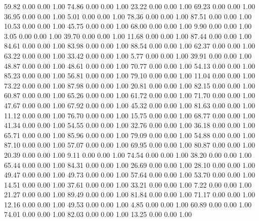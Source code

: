    59.82   0.00   0.00   1.00
   74.86   0.00   0.00   1.00
   23.22   0.00   0.00   1.00
   69.23   0.00   0.00   1.00
   36.95   0.00   0.00   1.00
    5.01   0.00   0.00   1.00
   78.36   0.00   0.00   1.00
   87.51   0.00   0.00   1.00
   10.53   0.00   0.00   1.00
   45.75   0.00   0.00   1.00
   68.00   0.00   0.00   1.00
    9.90   0.00   0.00   1.00
    3.05   0.00   0.00   1.00
   39.70   0.00   0.00   1.00
   11.68   0.00   0.00   1.00
   87.44   0.00   0.00   1.00
   84.61   0.00   0.00   1.00
   83.98   0.00   0.00   1.00
   88.54   0.00   0.00   1.00
   62.37   0.00   0.00   1.00
   63.22   0.00   0.00   1.00
   33.42   0.00   0.00   1.00
    5.77   0.00   0.00   1.00
   39.91   0.00   0.00   1.00
   48.87   0.00   0.00   1.00
   48.61   0.00   0.00   1.00
   70.77   0.00   0.00   1.00
   54.13   0.00   0.00   1.00
   85.23   0.00   0.00   1.00
   56.81   0.00   0.00   1.00
   79.10   0.00   0.00   1.00
   11.04   0.00   0.00   1.00
   73.22   0.00   0.00   1.00
   87.98   0.00   0.00   1.00
   20.81   0.00   0.00   1.00
   82.15   0.00   0.00   1.00
   60.87   0.00   0.00   1.00
   65.26   0.00   0.00   1.00
   61.72   0.00   0.00   1.00
   71.70   0.00   0.00   1.00
   47.67   0.00   0.00   1.00
   67.92   0.00   0.00   1.00
   45.32   0.00   0.00   1.00
   81.63   0.00   0.00   1.00
   11.12   0.00   0.00   1.00
   76.70   0.00   0.00   1.00
   15.75   0.00   0.00   1.00
   68.77   0.00   0.00   1.00
   41.34   0.00   0.00   1.00
   54.55   0.00   0.00   1.00
   32.76   0.00   0.00   1.00
   36.18   0.00   0.00   1.00
   65.71   0.00   0.00   1.00
   85.96   0.00   0.00   1.00
   79.09   0.00   0.00   1.00
   54.88   0.00   0.00   1.00
   87.10   0.00   0.00   1.00
   57.07   0.00   0.00   1.00
   69.95   0.00   0.00   1.00
   80.87   0.00   0.00   1.00
   20.39   0.00   0.00   1.00
    9.11   0.00   0.00   1.00
   74.54   0.00   0.00   1.00
   38.20   0.00   0.00   1.00
   65.44   0.00   0.00   1.00
   84.31   0.00   0.00   1.00
   26.69   0.00   0.00   1.00
   28.10   0.00   0.00   1.00
   49.47   0.00   0.00   1.00
   49.73   0.00   0.00   1.00
   57.64   0.00   0.00   1.00
   53.70   0.00   0.00   1.00
   14.51   0.00   0.00   1.00
   37.61   0.00   0.00   1.00
   33.21   0.00   0.00   1.00
    7.22   0.00   0.00   1.00
   21.27   0.00   0.00   1.00
   89.49   0.00   0.00   1.00
   81.84   0.00   0.00   1.00
   71.17   0.00   0.00   1.00
   12.16   0.00   0.00   1.00
   49.53   0.00   0.00   1.00
    4.85   0.00   0.00   1.00
   60.89   0.00   0.00   1.00
   74.01   0.00   0.00   1.00
   82.03   0.00   0.00   1.00
   13.25   0.00   0.00   1.00

